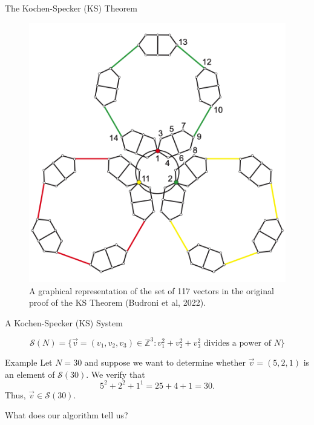 \documentclass[11pt]{beamer}
\begin{document}
\begin{frame}{The Kochen-Specker (KS) Theorem}

\centering

\begin{figure}
	\includegraphics[width=0.65 \textwidth]{Kochen-Specker sets}
	
	\caption{A graphical representation of the set of 117 vectors in the original proof of the KS Theorem (Budroni et al, 2022).}
	
\end{figure}

\end{frame}

\begin{frame}{A Kochen-Specker (KS) System}

\[\mathcal{S}(N) = \{\vec{v} = (v_{1}, v_{2}, v_{3}) \in \mathbb{Z}^{3} : v_{1}^{2} + v_{2}^{2} + v_{3}^{2} \text{ divides a power of } N\}\]

\vfill
\pause

\begin{block}{Example}
	Let $N = 30$ and suppose we want to determine whether $\vec{v} = (5, 2, 1)$ is an element of $\mathcal{S}(30)$. We verify that
	\[5^{2} + 2^{2} + 1^{1} = 25 + 4 + 1 = 30.\]
	Thus, $\vec{v} \in \mathcal{S}(30)$.
\end{block}

\end{frame}

\begin{frame}{}
	
\centering
	\Large{What does our algorithm tell us?}
	
\end{frame}
\end{document}
